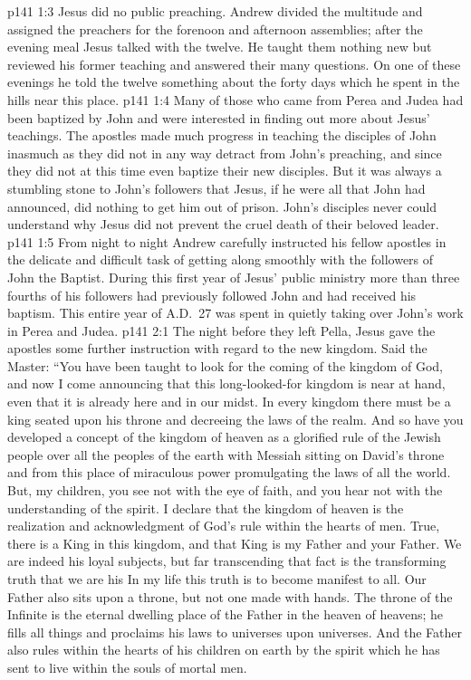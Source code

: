 \vs p141 1:3 Jesus did no public preaching. Andrew divided the multitude and assigned the preachers for the forenoon and afternoon assemblies; after the evening meal Jesus talked with the twelve. He taught them nothing new but reviewed his former teaching and answered their many questions. On one of these evenings he told the twelve something about the forty days which he spent in the hills near this place.
\vs p141 1:4 Many of those who came from Perea and Judea had been baptized by John and were interested in finding out more about Jesus’ teachings. The apostles made much progress in teaching the disciples of John inasmuch as they did not in any way detract from John’s preaching, and since they did not at this time even baptize their new disciples. But it was always a stumbling stone to John’s followers that Jesus, if he were all that John had announced, did nothing to get him out of prison. John’s disciples never could understand why Jesus did not prevent the cruel death of their beloved leader.\plusone
\vs p141 1:5 From night to night Andrew carefully instructed his fellow apostles in the delicate and difficult task of getting along smoothly with the followers of John the Baptist. During this first year of Jesus’ public ministry more than three fourths of his followers had previously followed John and had received his baptism. This entire year of A.D.~27 was spent in quietly taking over John’s work in Perea and Judea.
%
\vs p141 2:1 The night before they left Pella, Jesus gave the apostles some further instruction with regard to the new kingdom. Said the Master: \textcolor{ubdarkred}{“You have been taught to look for the coming of the kingdom of God, and now I come announcing that this long\hyp{}looked\hyp{}for kingdom is near at hand, even that it is already here and in our midst. In every kingdom there must be a king seated upon his throne and decreeing the laws of the realm. And so have you developed a concept of the kingdom of heaven as a glorified rule of the Jewish people over all the peoples of the earth with Messiah sitting on David’s throne and from this place of miraculous power promulgating the laws of all the world. But, my children, you see not with the eye of faith, and you hear not with the understanding of the spirit. I declare that the kingdom of heaven is the realization and acknowledgment of God’s rule within the hearts of men. True, there is a King in this kingdom, and that King is my Father and your Father. We are indeed his loyal subjects, but far transcending that fact is the transforming truth that we are his  In my life this truth is to become manifest to all. Our Father also sits upon a throne, but not one made with hands. The throne of the Infinite is the eternal dwelling place of the Father in the heaven of heavens; he fills all things and proclaims his laws to universes upon universes. And the Father also rules within the hearts of his children on earth by the spirit which he has sent to live within the souls of mortal men.}

